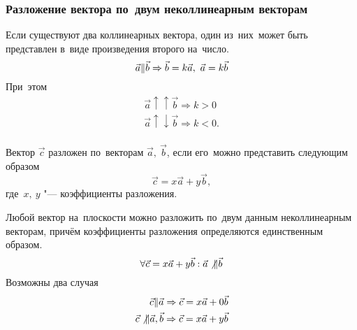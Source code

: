 \documentclass[]{scrartcl}
\begin{document}
\subsubsection{Разложение вектора по~двум неколлинеарным векторам}\label{vector-decomposition}
\begin{lemma}
Если существуют два коллинеарных вектора, один из~них~может быть представлен в~виде произведения второго на~число.
\begin{equation}\label{eq:vectors-1}
\vec{a} \Arrowvert \vec{b} \Rightarrow \vec{b}=k\vec{a},\ \vec{a}=k\vec{b}
\end{equation}
При~этом
\begin{equation}\label{eq:vectors-2}
\begin{aligned}
\vec{a} \uparrow \uparrow \vec{b} \Rightarrow k > 0 \\
\vec{a} \uparrow \downarrow \vec{b} \Rightarrow k < 0. \\
\end{aligned}
\end{equation}
\end{lemma}
Вектор ${\textstyle \vec{c}}$ разложен по~векторам ${\textstyle \vec{a},\ \vec{b}}$, если его~можно представить следующим образом
\begin{equation}\label{eq:vectors-3}
\vec{c}=x\vec{a}+y\vec{b},
\end{equation}
где~${\textstyle x,\ y}$ "--- коэффициенты разложения.
\begin{theorem}
	Любой вектор на~плоскости можно разложить по~двум данным неколлинеарным векторам, причём коэффициенты разложения определяются единственным образом.
	\begin{equation}\label{eq:vectors-4}
	\forall \vec{c}=x\vec{a}+y\vec{b}: \vec{a} \not \Arrowvert \vec{b}
	\end{equation}
	Возможны два случая
	\begin{equation}\label{eq:vectors-5}
	\begin{aligned}
	\vec{c} \Arrowvert \vec{a} \Rightarrow \vec{c}=x\vec{a}+0\vec{b}\\
	\vec{c} \not \Arrowvert \vec{a},\vec{b} \Rightarrow \vec{c}=x\vec{a}+y\vec{b}
	\end{aligned}
	\end{equation}
\end{theorem}
\end{document}
